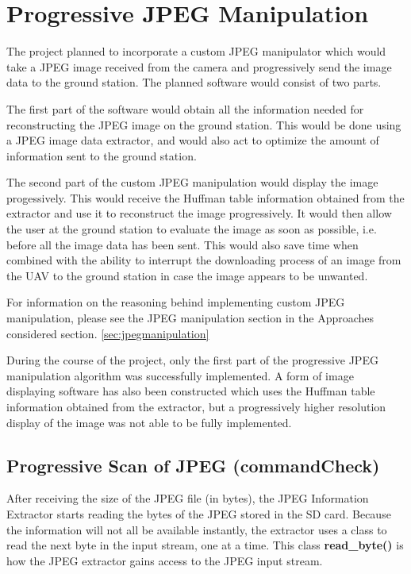 \section{Progressive JPEG Manipulation}
The project planned to incorporate a custom JPEG manipulator which would
take a JPEG image received from the camera and progressively
send the image data to the ground station. 
The planned software would consist of two parts.

The first part of the software would obtain all the information
needed for reconstructing the JPEG image on the ground station.
This would be done using a JPEG image data extractor, and would 
also act to optimize the amount of information sent to the ground station.

The second part of the custom JPEG manipulation
would display the image progessively. 
This would receive the Huffman table information obtained 
from the extractor and use it to reconstruct the image progressively. 
It would then allow the user
at the ground station to evaluate the image as soon as possible,
i.e. before all the image data has been sent. This would also 
save time when combined with the ability to interrupt the 
downloading process of an image from the UAV to the
ground station in case the image appears to be unwanted. 

For information on the reasoning behind implementing 
custom JPEG manipulation, please see 
the JPEG manipulation section in the 
Approaches considered section. \ref{sec:jpegmanipulation}

During the course of the project, only the first part
of the progressive JPEG manipulation algorithm was 
successfully implemented. A form of image displaying 
software has also been constructed which uses the 
Huffman table information obtained from the extractor, 
but a progressively higher resolution display of 
the image was not able to be fully implemented.

\subsection{Progressive Scan of JPEG (commandCheck)}

After receiving the size of the JPEG file (in bytes), 
the JPEG Information Extractor starts reading the bytes of the JPEG stored in the SD card. 
Because the information will not all be available instantly, 
the extractor uses a class to read the next byte in the input stream, one at a time. This class \textbf{read\_byte()} is 
how the JPEG extractor gains access to the JPEG input stream. 

